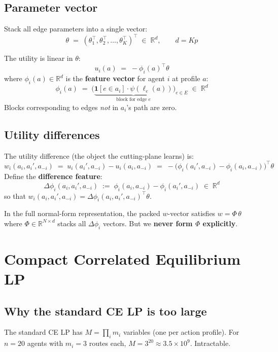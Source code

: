 \documentclass[11pt]{article}
\newcommand{\R}{\mathbb{R}}
\begin{document}
\subsection{Parameter vector}

Stack all edge parameters into a single vector:
\[
\theta \;=\; (\theta_1^\top, \theta_2^\top, \ldots, \theta_K^\top)^\top \;\in\; \R^d, \qquad d = Kp
\]

The utility is linear in $\theta$:
\[
u_i(a) \;=\; -\phi_i(a)^\top \theta
\]
where $\phi_i(a) \in \R^d$ is the \textbf{feature vector} for agent $i$ at profile $a$:
\[
\phi_i(a) \;=\; \bigl(\underbrace{\mathbf{1}[e \in a_i] \cdot \psi(\ell_e(a))}_{\text{block for edge } e}\bigr)_{e \in E} \;\in\; \R^d
\]
Blocks corresponding to edges \emph{not} in $a_i$'s path are zero.

\subsection{Utility differences}

The utility difference (the object the cutting-plane learns) is:
\[
w_i(a_i, a_i', a_{-i}) \;=\; u_i(a_i', a_{-i}) - u_i(a_i, a_{-i}) \;=\; -\bigl(\phi_i(a_i', a_{-i}) - \phi_i(a_i, a_{-i})\bigr)^\top \theta
\]
Define the \textbf{difference feature}:
\[
\Delta\phi_i(a_i, a_i', a_{-i}) \;:=\; \phi_i(a_i, a_{-i}) - \phi_i(a_i', a_{-i}) \;\in\; \R^d
\]
so that $w_i(a_i, a_i', a_{-i}) = \Delta\phi_i(a_i, a_i', a_{-i})^\top \theta$.

In the full normal-form representation, the packed $w$-vector satisfies $w = \Phi\,\theta$ where $\Phi \in \R^{N \times d}$ stacks all $\Delta\phi_i$ vectors. But we \textbf{never form $\Phi$ explicitly}.

\section{Compact Correlated Equilibrium LP}

\subsection{Why the standard CE LP is too large}

The standard CE LP has $M = \prod_i m_i$ variables (one per action profile). For $n=20$ agents with $m_i = 3$ routes each, $M = 3^{20} \approx 3.5 \times 10^9$. Intractable.
\end{document}
